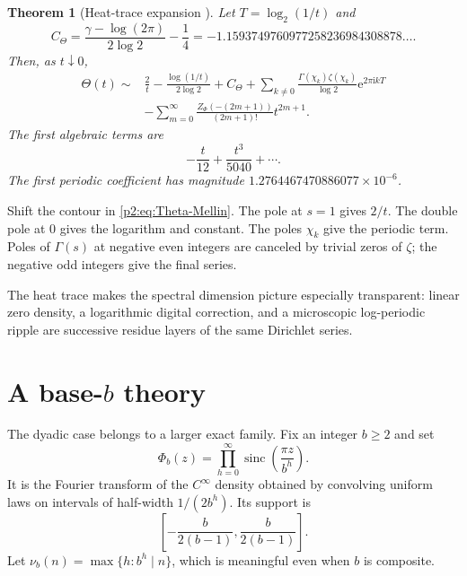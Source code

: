 \documentclass[11pt]{article}
\numberwithin{equation}{section}
\newtheorem{theorem}{Theorem}[section]
\theoremstyle{definition}
\theoremstyle{remark}
\newcommand{\sinc}{\operatorname{sinc}}
\newcommand{\e}{\mathrm e}
\newcommand{\ii}{\mathrm i}
\begin{document}
\begin{theorem}[Heat-trace expansion \NewResult]
\label{p2:thm:heat}
Let $T=\log_2(1/t)$ and
\begin{equation}
 C_{\Theta}=\frac{\gamma-\log(2\pi)}{2\log2}-\frac14
 =-1.1593749760977258236984308878\ldots.                  \label{p2:eq:Ctheta}
\end{equation}
Then, as $t\downarrow0$,
\begin{align}
 \Theta(t)\sim{}&\frac2t-\frac{\log(1/t)}{2\log2}+C_{\Theta}
 +\sum_{k\ne0}\frac{\Gamma(\chi_k)\zeta(\chi_k)}{\log2}
   \e^{2\pi\ii kT}                                      \label{p2:eq:heat-asymp}\\
 &-\sum_{m=0}^{\infty}
 \frac{Z_\Phi(-(2m+1))}{(2m+1)!}t^{2m+1}.\nonumber
\end{align}
The first algebraic terms are
\begin{equation}
 -\frac{t}{12}+\frac{t^3}{5040}+\cdots.                   \label{p2:eq:heat-first}
\end{equation}
The first periodic coefficient has magnitude
$1.2764467470886077\times10^{-6}$.
\end{theorem}

\begin{proofidea}
Shift the contour in \eqref{p2:eq:Theta-Mellin}.  The pole at $s=1$ gives $2/t$.
The double pole at $0$ gives the logarithm and constant.  The poles $\chi_k$
give the periodic term.  Poles of $\Gamma(s)$ at negative even integers are
canceled by trivial zeros of $\zeta$; the negative odd integers give the final
series.
\end{proofidea}

The heat trace makes the spectral dimension picture especially transparent:
linear zero density, a logarithmic digital correction, and a microscopic
log-periodic ripple are successive residue layers of the same Dirichlet series.

\section{A base-$b$ theory}
\label{p2:sec:baseb}

The dyadic case belongs to a larger exact family.  Fix an integer $b\ge2$ and set
\begin{equation}
 \Phi_b(z)=\prod_{h=0}^{\infty}\sinc\!\left(\frac{\pi z}{b^h}\right).       \label{p2:eq:Phib}
\end{equation}
It is the Fourier transform of the $C^\infty$ density obtained by convolving
uniform laws on intervals of half-width $1/(2b^h)$.  Its support is
\begin{equation}
 \left[-\frac{b}{2(b-1)},\frac{b}{2(b-1)}\right].          \label{p2:eq:supportb}
\end{equation}
Let $\nu_b(n)=\max\{h:b^h\mid n\}$, which is meaningful even when $b$ is
composite.
\end{document}
